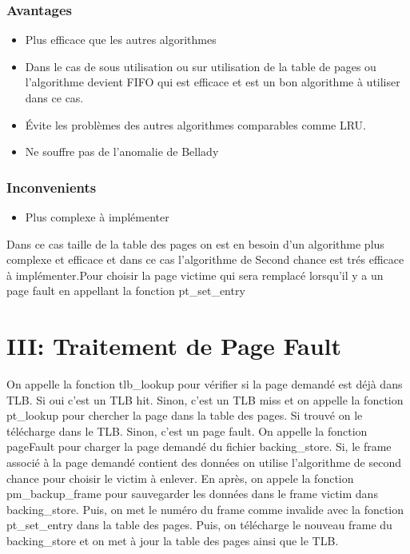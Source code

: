 \documentclass{article}
\begin{document}
\subsubsection*{Avantages}
\begin{itemize}
\item Plus efficace que les autres algorithmes
\item Dans le cas de sous utilisation ou sur utilisation de la table de pages ou   l'algorithme devient FIFO qui est efficace et est un bon algorithme à utiliser dans ce cas.
\item Évite les problèmes des autres algorithmes comparables comme LRU.
\item Ne souffre pas de l'anomalie de Bellady
\end{itemize}
\subsubsection*{Inconvenients}
\begin{itemize}
\item Plus complexe à implémenter 
\end{itemize}
Dans ce cas taille de la table des pages on est en besoin d'un algorithme plus complexe et efficace et dans ce cas l'algorithme de Second chance est trés efficace à implémenter.Pour choisir la page victime qui sera remplacé lorsqu'il y a un page fault en appellant la fonction pt\_set\_entry

\section*{III: Traitement de Page Fault}
On appelle la fonction tlb\_lookup pour vérifier si la page demandé est déjà dans TLB. Si oui c'est un TLB hit. Sinon, c'est un TLB miss et on appelle la fonction pt\_lookup pour chercher la page dans la table des pages. Si trouvé on le télécharge dans le TLB. Sinon, c'est un page fault. On appelle la fonction pageFault pour charger la page demandé du fichier backing\_store. Si, le frame associé à la page demandé contient des données on utilise l'algorithme de second chance pour choisir le victim à enlever. En après, on appele la fonction pm\_backup\_frame pour sauvegarder les données dans le frame victim dans backing\_store. Puis, on met le numéro du frame comme invalide avec la fonction pt\_set\_entry dans la table des pages. Puis, on télécharge le nouveau frame du backing\_store et on met à jour la table des pages ainsi que le TLB.
\end{document}
